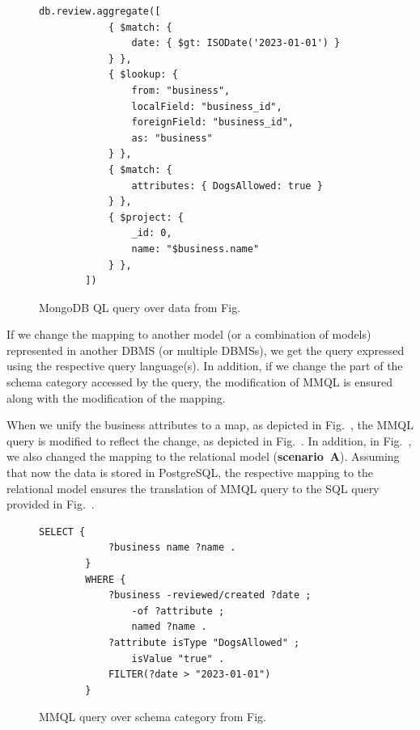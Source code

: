 \begin{figure}[!htb]
    \begin{lstlisting}[language = MQL]
        db.review.aggregate([
            { $match: {
                date: { $gt: ISODate('2023-01-01') }
            } },
            { $lookup: {
                from: "business",
                localField: "business_id",
                foreignField: "business_id",
                as: "business"
            } },
            { $match: {
                attributes: { DogsAllowed: true }
            } },
            { $project: {
                _id: 0,
                name: "$business.name"
            } },
        ])
    \end{lstlisting}
    \caption{MongoDB QL query over data from Fig.~}
\end{figure}

If we change the mapping to another model (or a combination of models) represented in another DBMS (or multiple DBMSs), we get the query expressed using the respective query language(s). In addition, if we change the part of the schema category accessed by the query, the modification of MMQL is ensured 
along with the modification of the mapping.


\begin{example}
When we unify the business attributes to a map, as depicted in Fig.~, the MMQL query is modified to reflect the change, as depicted in Fig.~. In addition, in Fig.~, we also changed the mapping to the relational model (\textbf{scenario~A}). Assuming that now the data is stored in PostgreSQL, the respective mapping to the relational model ensures the translation of MMQL query to the SQL query provided in Fig.~.
\end{example}

\begin{figure}[!htb]
    \begin{lstlisting}[language = MMQL]
        SELECT {
            ?business name ?name .
        }
        WHERE {
            ?business -reviewed/created ?date ;
                -of ?attribute ;
                named ?name .
            ?attribute isType "DogsAllowed" ;
                isValue "true" .
            FILTER(?date > "2023-01-01")
        }
    \end{lstlisting}
    \caption{MMQL query over schema category from Fig.~}
\end{figure}

